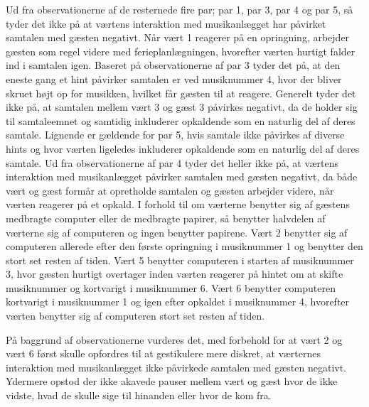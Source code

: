 Ud fra observationerne af de resternede fire par; par 1, par 3, par 4 og par 5, så tyder det ikke på at værtens interaktion med musikanlægget har påvirket samtalen med gæsten negativt. Når vært 1 reagerer på en opringning, arbejder gæsten som regel videre med ferieplanlægningen, hvorefter værten hurtigt falder ind i samtalen igen. Baseret på observationerne af par 3 tyder det på, at den eneste gang et hint påvirker samtalen er ved musiknummer 4, hvor der bliver skruet højt op for musikken, hvilket får gæsten til at reagere. Generelt tyder det ikke på, at samtalen mellem vært 3 og gæst 3 påvirkes negativt, da de holder sig til samtaleemnet og samtidig inkluderer opkaldende som en naturlig del af deres samtale. Lignende er gældende for par 5, hvis samtale ikke påvirkes af diverse hints og hvor værten ligeledes inkluderer opkaldende som en naturlig del af deres samtale. Ud fra observationerne af par 4 tyder det heller ikke på, at værtens interaktion med musikanlægget påvirker samtalen med gæsten negativt, da både vært og gæst formår at opretholde samtalen og gæsten arbejder videre, når værten reagerer på et opkald. \blankline
%
I forhold til om værterne benytter sig af gæstens medbragte computer eller de medbragte papirer, så benytter halvdelen af værterne sig af computeren og ingen benytter papirene. Vært 2 benytter sig af computeren allerede efter den første opringning i musiknummer 1 og benytter den stort set resten af tiden. Vært 5 benytter computeren i starten af musiknummer 3, hvor gæsten hurtigt overtager inden værten reagerer på hintet om at skifte musiknummer og kortvarigt i musiknummer 6. Vært 6 benytter computeren kortvarigt i musiknummer 1 og igen efter opkaldet i musiknummer 4, hvorefter værten benytter sig af computeren stort set resten af tiden. 

På baggrund af observationerne vurderes det, med forbehold for at vært 2 og vært 6 først skulle opfordres til at gestikulere mere diskret, at værternes interaktion med musikanlægget ikke påvirkede samtalen med gæsten negativt. Ydermere opstod der ikke akavede pauser mellem vært og gæst hvor de ikke vidste, hvad de skulle sige til hinanden eller hvor de kom fra. 


